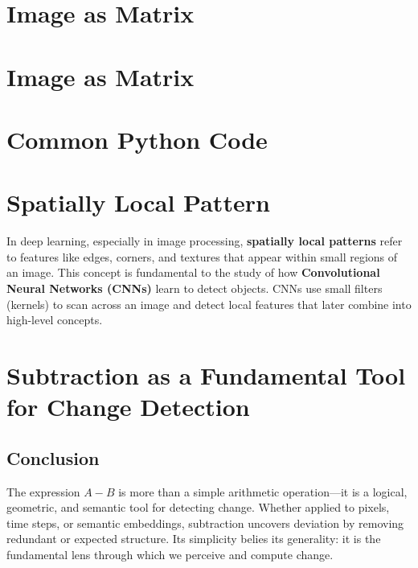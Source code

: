 \documentclass[grad]{ontariotechu-thesis}
\begin{document}
\chapter{Image as Matrix}


\chapter{Image as Matrix}


\chapter{Common Python Code}




\chapter{Spatially Local Pattern}
In deep learning, especially in image processing, \textbf{spatially local patterns} refer to features like edges, corners, and textures that appear within small regions of an image. This concept is fundamental to the study of how \textbf{Convolutional Neural Networks (CNNs)} learn to detect objects. CNNs use small filters (kernels) to scan across an image and detect local features that later combine into high-level concepts.
\chapter{Subtraction as a Fundamental Tool for Change Detection}







\section{Conclusion}
The expression $A - B$ is more than a simple arithmetic operation—it is a logical, geometric, and semantic tool for detecting change. Whether applied to pixels, time steps, or semantic embeddings, subtraction uncovers deviation by removing redundant or expected structure. Its simplicity belies its generality: it is the fundamental lens through which we perceive and compute change.

%

%
\end{document}
